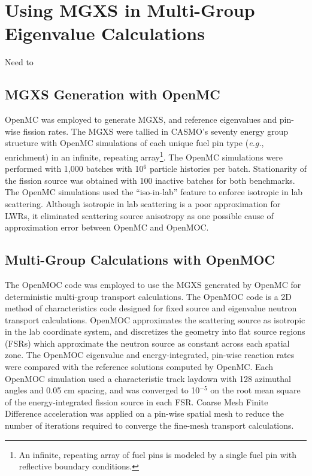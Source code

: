 \section{Using MGXS in Multi-Group Eigenvalue Calculations}
\label{sec:evaluation}

Need to 

\subsection{MGXS Generation with OpenMC}
\label{subsec:openmc}

OpenMC was employed to generate MGXS, and reference eigenvalues and pin-wise fission rates. The MGXS were tallied in CASMO's seventy energy group structure \cite{rhodes2006casmo} with OpenMC simulations of each unique fuel pin type (\textit{e.g.}, enrichment) in an infinite, repeating array\footnote{An infinite, repeating array of fuel pins is modeled by a single fuel pin with reflective boundary conditions.}. The OpenMC simulations were performed with 1,000 batches with 10$^{6}$ particle histories per batch. Stationarity of the fission source was obtained with 100 inactive batches for both benchmarks. The OpenMC simulations used the ``iso-in-lab'' feature to enforce isotropic in lab scattering. Although isotropic in lab scattering is a poor approximation for LWRs, it eliminated scattering source anisotropy as one possible cause of approximation error between OpenMC and OpenMOC.


\subsection{Multi-Group Calculations with OpenMOC}
\label{subsec:openmoc}

The OpenMOC code \cite{boyd2014openmoc} was employed to use the MGXS generated by OpenMC for deterministic multi-group transport calculations. The OpenMOC code is a 2D method of characteristics code designed for fixed source and eigenvalue neutron transport calculations. OpenMOC approximates the scattering source as isotropic in the lab coordinate system, and discretizes the geometry into flat source regions (FSRs) which approximate the neutron source as constant across each spatial zone. The OpenMOC eigenvalue and energy-integrated, pin-wise reaction rates were compared with the reference solutions computed by OpenMC. Each OpenMOC simulation used a characteristic track laydown with 128 azimuthal angles and 0.05 cm spacing, and was converged to 10$^{-5}$ on the root mean square of the energy-integrated fission source in each FSR. Coarse Mesh Finite Difference acceleration was applied on a pin-wise spatial mesh to reduce the number of iterations required to converge the fine-mesh transport calculations.


